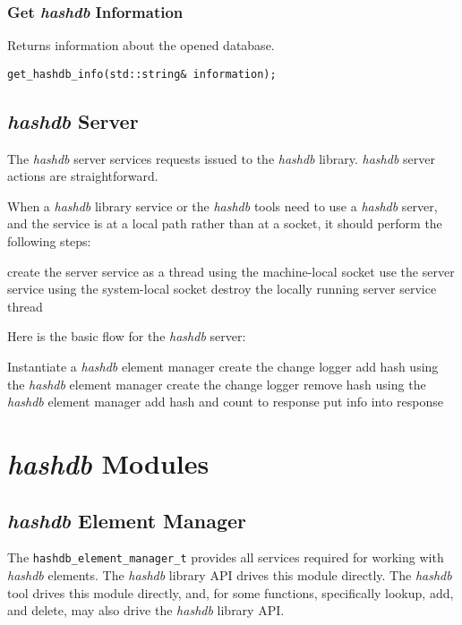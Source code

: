 \documentclass[12pt,twoside]{article}
\newcommand{\hdb}{\emph{hashdb}\xspace}
\begin{document}
\subsubsection{Get \hdb Information}
Returns information about the opened database.

\begin{small}
\begin{verbatim}
get_hashdb_info(std::string& information);
\end{verbatim}
\end{small}

\subsection{\hdb Server}
The \hdb server services requests issued to the \hdb library.
\hdb server actions are straightforward.

When a \hdb library service or the \hdb tools need to use a \hdb server,
and the service is at a local path rather than at a socket,
it should perform the following steps:
\begin{algorithmic}
\STATE create the server service as a thread using the machine-local socket
\STATE use the server service using the system-local socket
\STATE destroy the locally running server service thread
\end{algorithmic}

Here is the basic flow for the \hdb server:
\begin{algorithmic}
\STATE Instantiate a \hdb element manager
    \STATE create the change logger
      \STATE add hash using the \hdb element manager
    \ENDWHILE
    \STATE create the change logger
      \STATE remove hash using the \hdb element manager
    \ENDWHILE
        \STATE add hash and count to response
      \ENDIF
    \ENDWHILE
    \STATE put info into response
  \ENDIF
\ENDWHILE
\end{algorithmic}

\section{\hdb Modules}
\subsection{\hdb Element Manager}
The \texttt{hashdb\_element\_manager\_t}
provides all services required for working with \hdb elements.
The \hdb library API drives this module directly.
The \hdb tool drives this module directly,
and, for some functions, specifically lookup, add, and delete,
may also drive the \hdb library API.
\end{document}
